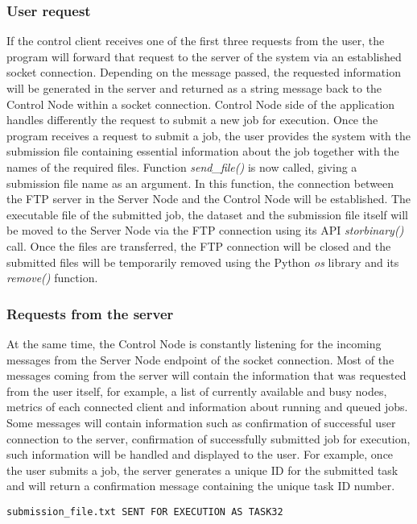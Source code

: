 \documentclass[10pt]{report}
\begin{document}
\subsubsection{User request}
If the control client receives one of the first three requests from the user, the program will forward that request to the server of the system via an established socket connection. Depending on the message passed, the requested information will be generated in the server and returned as a string message back to the Control Node within a socket connection. Control Node side of the application handles differently the request to submit a new job for execution. Once the program receives a request to submit a job, the user provides the system with the submission file containing essential information about the job together with the names of the required files. Function \textit{send\_file()} is now called, giving a submission file name as an argument. In this function, the connection between the FTP server in the Server Node and the Control Node will be established. The executable file of the submitted job, the dataset and the submission file itself will be moved to the Server Node via the FTP connection using its API \textit{storbinary()} call. Once the files are transferred, the FTP connection will be closed and the submitted files will be temporarily removed using the Python \textit{os} library and its \textit{remove()} function.

\subsubsection{Requests from the server}

At the same time, the Control Node is constantly listening for the incoming messages from the Server Node endpoint of the socket connection. Most of the messages coming from the server will contain the information that was requested from the user itself, for example, a list of currently available and busy nodes, metrics of each connected client and information about running and queued jobs. Some messages will contain information such as confirmation of successful user connection to the server, confirmation of successfully submitted job for execution, such information will be handled and displayed to the user. For example, once the user submits a job, the server generates a unique ID for the submitted task and will return a confirmation message containing the unique task ID number.

\begin{lstlisting}[style=DOS]
    submission_file.txt SENT FOR EXECUTION AS TASK32
\end{lstlisting}
\end{document}
